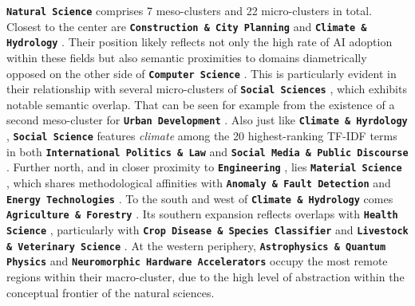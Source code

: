 \documentclass{article}
\begin{document}
	\textbf{\texttt{Natural Science}}  comprises 7 meso-clusters and 22 micro-clusters in total. Closest to the center are \textbf{\texttt{Construction \& City Planning}}  and \textbf{\texttt{Climate \& Hydrology}} . Their position likely reflects not only the high rate of AI adoption within these fields but also semantic proximities to domains diametrically opposed on the other side of \textbf{\texttt{Computer Science}} . This is particularly evident in their relationship with several micro-clusters of \textbf{\texttt{Social Sciences}} , which exhibits notable semantic overlap. That can be seen for example from the existence of a second meso-cluster for \textbf{\texttt{Urban Development}} . Also just like \textbf{\texttt{Climate \& Hyrdology}} , \textbf{\texttt{Social Science}}  features \textit{climate} among the 20 highest-ranking TF-IDF terms in both \textbf{\texttt{International Politics \& Law}}  and \textbf{\texttt{Social Media \& Public Discourse}} . Further north, and in closer proximity to \textbf{\texttt{Engineering}} , lies \textbf{\texttt{Material Science}} , which shares methodological affinities with \textbf{\texttt{Anomaly \& Fault Detection}}  and \textbf{\texttt{Energy Technologies}} . To the south and west of \textbf{\texttt{Climate \& Hydrology}}  comes \textbf{\texttt{Agriculture \& Forestry}} . Its southern expansion reflects overlaps with \textbf{\texttt{Health Science}} , particularly with \textbf{\texttt{Crop Disease \& Species Classifier}}  and \textbf{\texttt{Livestock \& Veterinary Science}} . At the western periphery, \textbf{\texttt{Astrophysics \& Quantum Physics}}  and \textbf{\texttt{Neuromorphic Hardware Accelerators}}  occupy the most remote regions within their macro-cluster, due to the high level of abstraction within the conceptual frontier of the natural sciences.
	
\end{document}

